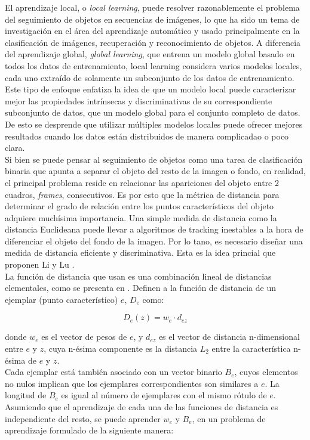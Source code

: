 \documentclass[a4paper,10pt]{article}
\begin{document}
El aprendizaje local, o \textit{local learning}, puede resolver razonablemente el problema del seguimiento de objetos en secuencias de imágenes, lo
que ha sido un tema de investigación en el área del aprendizaje automático \cite{local-learning-machine-learnin} y usado principalmente en la clasificación 
de imágenes, recuperación y reconocimiento de objetos. A diferencia del aprendizaje global, \textit{global learning}, que entrena un modelo global basado en 
todos los datos de entrenamiento, local learning considera varios modelos locales, cada uno extraído de solamente un subconjunto de los datos de entrenamiento.
Este tipo de enfoque enfatiza la idea de que un modelo local puede caracterizar mejor las propiedades intrínsecas y discriminativas de su correspondiente 
subconjunto de datos, que un modelo global para el conjunto completo de datos. De esto se desprende que utilizar múltiples modelos locales puede ofrecer 
mejores resultados cuando los datos están distribuidos de manera complicadao o poco clara.\\
Si bien se puede pensar al seguimiento de objetos como una tarea de clasificación binaria 
que apunta a separar el objeto del resto de la imagen o fondo, en realidad, el principal
problema reside en relacionar las apariciones del objeto entre 2 cuadros, \textit{frames},
consecutivos. Es por esto que la métrica de distancia para determinar el grado de 
relación entre los puntos característicos del objeto adquiere muchísima importancia.
Una simple medida de distancia como la distancia Euclideana puede llevar a algoritmos
de tracking inestables a la hora de diferenciar el objeto del fondo de la imagen. Por
lo tano, es necesario diseñar una medida de distancia eficiente y discriminativa. Esta 
es la idea princial que proponen Li y Lu \cite{local-learning}.\\
La función de distancia que usan es una combinación lineal de distancias elementales, 
como se presenta en \cite{malisiewicz-cvpr08}. Definen a la función de distancia de un 
ejemplar (punto característico) $e$, $D_{e}$ como:

\begin{equation}
    \label{eq:distance-exemplar}
    D_{e}(z) = w_{e} \cdot d_{ez}
\end{equation}

donde $w_{e}$ es el vector de pesos de $e$, y $d_{ez}$ es el vector de distancia 
n-dimensional entre $e$ y $z$, cuya n-ésima componente es la distancia $L_{2}$ 
entre la característica n-ésima de $e$ y $z$.\\
Cada ejemplar está también asociado con un vector binario $B_{e}$, cuyos elementos 
no nulos implican que los ejemplares correspondientes son similares a $e$. La 
longitud de $B_{e}$ es igual al número de ejemplares con el mismo rótulo de $e$.
Asumiendo que el aprendizaje de cada una de las funciones de distancia es 
independiente del resto, se puede aprender $w_{e}$ y $B_{e}$, en un problema 
de aprendizaje formulado de la siguiente manera:
\end{document}
